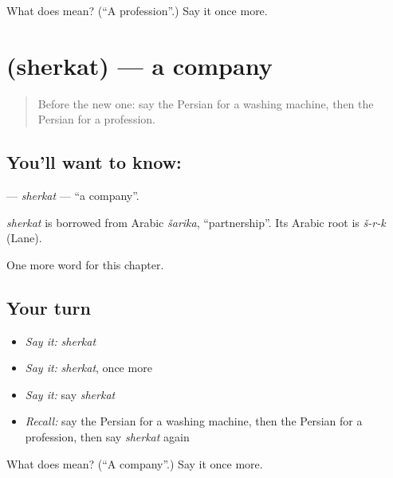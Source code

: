 \begin{tcolorbox}[breakable,colback=teal!4,colframe=teal!35!black,title={Before you move on}]
What does  mean? (\textquotedblleft{}A profession\textquotedblright{}.) Say it once more.
\end{tcolorbox}
\section[\texorpdfstring{\fa{شرکت} (sherkat)}{شرکت (sherkat)}]{ (sherkat) — a company}

\label{lesson:FA-C176-sherkat}



\begin{quote}
Before the new one: say the Persian for a washing machine, then the Persian for a profession.
\end{quote}

\subsection*{You'll want to know: }
\textbf{} — \emph{sherkat} — \textquotedblleft{}a company\textquotedblright{}.

\begin{cousinweb}
\emph{sherkat} is borrowed from Arabic \emph{šarika}, \textquotedblleft{}partnership\textquotedblright{}. Its Arabic root is \emph{š-r-k} (Lane).
\end{cousinweb}

\begin{grammarlens}[title={What you've built}]
One more word for this chapter.
\end{grammarlens}

\subsection*{Your turn}
\begin{itemize}
\raggedright
  \item \emph{Say it:} \emph{sherkat}
  \item \emph{Say it:} \emph{sherkat}, once more
  \item \emph{Say it:} say \emph{sherkat}
  \item \emph{Recall:} say the Persian for a washing machine, then the Persian for a profession, then say \emph{sherkat} again
\end{itemize}

\begin{tcolorbox}[breakable,colback=teal!4,colframe=teal!35!black,title={Before you move on}]
What does  mean? (\textquotedblleft{}A company\textquotedblright{}.) Say it once more.
\end{tcolorbox}
